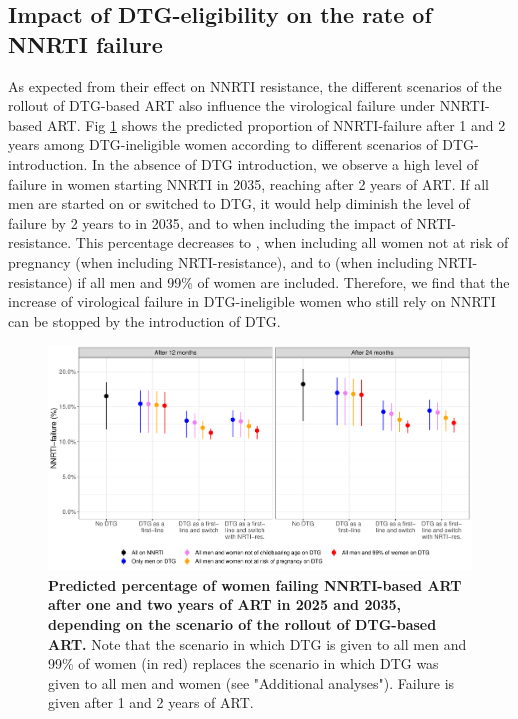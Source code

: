 \documentclass[10pt,letterpaper]{article}
\begin{document}
\subsection*{Impact of DTG-eligibility on the rate of NNRTI failure}
As expected from their effect on NNRTI resistance, the different scenarios of the rollout of DTG-based ART also influence the
virological failure under NNRTI-based ART. Fig \ref{fig5} shows the predicted proportion of NNRTI-failure after 1 and 2 years among DTG-ineligible women according to different scenarios of DTG-introduction.
In the absence of DTG introduction, we observe a high level of failure in women starting NNRTI in 2035, reaching \numberk after 2 years of ART. If all men are started on or switched to DTG, it would help diminish the level of failure by 2 years to \numberl in 2035, and to \numberlb when including the impact of NRTI-resistance. This percentage decreases to \numberm, when including all women not at risk of pregnancy (\numbermb when including NRTI-resistance), and to \numbern (\numbernb when including NRTI-resistance) if all men and 99\% of women are included. Therefore, we find that the increase of virological failure in DTG-ineligible women who still rely on NNRTI can be stopped by the introduction of DTG.

\begin{figure}[h]
\includegraphics[width=14cm]{../figures/Fig5.pdf}
\vspace{0.5cm}
\caption{{\bf Predicted percentage of women failing NNRTI-based ART after one and two years of ART in 2025 and 2035, depending on the scenario of the rollout of DTG-based ART.} Note that the scenario in which DTG is given to all men and 99\% of women (in red) replaces the scenario in which DTG was given to all men and women (see "Additional analyses"). Failure is given after 1 and 2 years of ART.}\label{fig5}
\end{figure}
\end{document}
